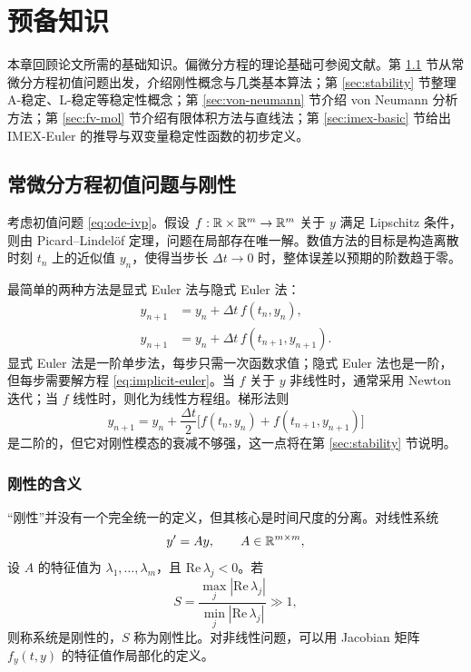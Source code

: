 \chapter{预备知识}

本章回顾论文所需的基础知识。偏微分方程的理论基础可参阅文献\cite{zhou2005}。第 \ref{sec:ode-stiff} 节从常微分方程初值问题出发，介绍刚性概念与几类基本算法；第 \ref{sec:stability} 节整理 A-稳定、L-稳定等稳定性概念；第 \ref{sec:von-neumann} 节介绍 von Neumann 分析方法；第 \ref{sec:fv-mol} 节介绍有限体积方法与直线法；第 \ref{sec:imex-basic} 节给出 IMEX-Euler 的推导与双变量稳定性函数的初步定义。

\section{常微分方程初值问题与刚性}
\label{sec:ode-stiff}

考虑初值问题 \eqref{eq:ode-ivp}。假设 $f:\mathbb{R}\times\mathbb{R}^m\to\mathbb{R}^m$ 关于 $y$ 满足 Lipschitz 条件，则由 Picard--Lindel\"of 定理，问题在局部存在唯一解。数值方法的目标是构造离散时刻 $t_n$ 上的近似值 $y_n$，使得当步长 $\Delta t\to0$ 时，整体误差以预期的阶数趋于零。

最简单的两种方法是显式 Euler 法与隐式 Euler 法：
\begin{align}
  y_{n+1} &= y_n+\Delta t\,f(t_n,y_n), \label{eq:explicit-euler}\\
  y_{n+1} &= y_n+\Delta t\,f(t_{n+1},y_{n+1}). \label{eq:implicit-euler}
\end{align}
显式 Euler 法是一阶单步法，每步只需一次函数求值；隐式 Euler 法也是一阶，但每步需要解方程 \eqref{eq:implicit-euler}。当 $f$ 关于 $y$ 非线性时，通常采用 Newton 迭代；当 $f$ 线性时，则化为线性方程组。梯形法则
\begin{equation}
  y_{n+1}=y_n+\frac{\Delta t}{2}\bigl[f(t_n,y_n)+f(t_{n+1},y_{n+1})\bigr]
  \label{eq:trapezoidal}
\end{equation}
是二阶的，但它对刚性模态的衰减不够强，这一点将在第 \ref{sec:stability} 节说明。

\subsection{刚性的含义}

“刚性”并没有一个完全统一的定义，但其核心是时间尺度的分离。对线性系统
\begin{equation}
  y'=Ay,\qquad A\in\mathbb{R}^{m\times m},
  \label{eq:linear-system}
\end{equation}
设 $A$ 的特征值为 $\lambda_1,\dots,\lambda_m$，且 $\mathrm{Re}\,\lambda_j<0$。若
\begin{equation}
  S=\frac{\max_j|\mathrm{Re}\,\lambda_j|}{\min_j|\mathrm{Re}\,\lambda_j|}\gg1,
  \label{eq:stiffness-ratio}
\end{equation}
则称系统是刚性的，$S$ 称为刚性比。对非线性问题，可以用 Jacobian 矩阵 $f_y(t,y)$ 的特征值作局部化的定义。

